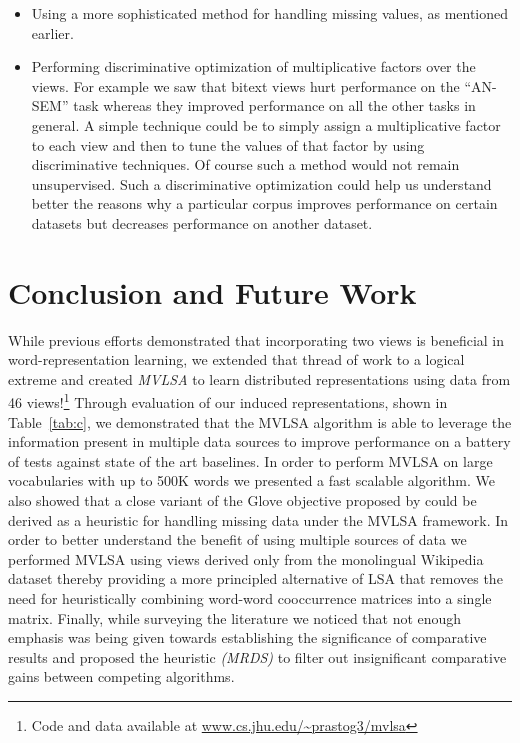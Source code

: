 \documentclass[11pt]{article}
\begin{document}
{\begin{itemize}[leftmargin=*]
  have been caused due to lack of PMI type features have been reported
  to work well by .  
\item Using a more sophisticated method for handling missing values,
  as mentioned earlier.
\item Performing discriminative optimization of multiplicative
  factors over the views. For example we saw that bitext views hurt
  performance on the ``AN-SEM'' task whereas they improved performance
  on all the other tasks in general. A simple technique could be to
  simply assign a multiplicative factor to each view and 
  then to tune the values of that factor by using discriminative
  techniques. Of course such a method would not remain unsupervised. Such a discriminative optimization could help us understand
  better the reasons why a particular corpus improves performance on
  certain datasets but decreases performance on another dataset. %
\end{itemize}
}

\section{Conclusion and Future Work}
While previous efforts demonstrated that incorporating two views is
beneficial in word-representation learning, we extended that thread of
work to a logical extreme and created \emph{MVLSA} to learn
distributed representations using data from 46 views!\footnote{Code
  and data available at \url{www.cs.jhu.edu/~prastog3/mvlsa}} Through
evaluation of our induced representations, shown in Table~\ref{tab:c},
we demonstrated that the MVLSA algorithm is able to leverage the
information present in multiple data sources to improve performance on
a battery of tests against state of the art baselines. In order to
perform MVLSA on large vocabularies with up to 500K words we presented
a fast scalable algorithm. We also showed that a close variant of the
Glove objective proposed by  could be
derived as a heuristic for handling missing data under the MVLSA
framework. In order to better understand the benefit of using multiple
sources of data we performed MVLSA using views derived only from the
monolingual Wikipedia dataset thereby providing a more principled
alternative of LSA that removes the need for heuristically combining
word-word cooccurrence matrices into a single matrix. Finally, while
surveying the literature we noticed that not enough emphasis was being
given towards establishing the significance of comparative results and
proposed the heuristic  \emph{(MRDS)} to filter out insignificant
comparative gains between competing algorithms.
\end{document}
